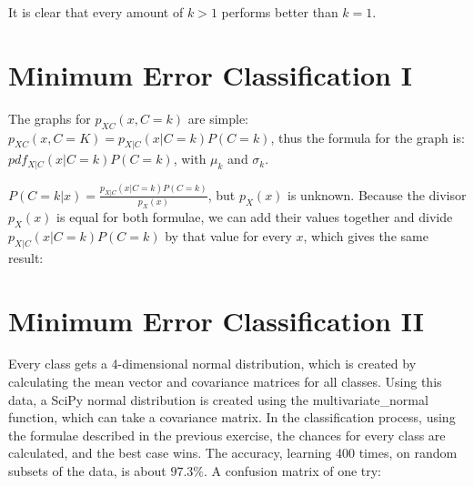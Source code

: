 \documentclass{article}
\begin{document}
\inputminted{text}{knnb.txt}

It is clear that every amount of $k > 1$ performs better than $k=1$.

\section{Minimum Error Classification I}
The graphs for $p_{XC}(x, C=k)$ are simple: $p_{XC}(x, C=K) =
p_{X|C}(x|C=k)P(C=k)$, thus the formula for the graph is: $pdf_{X|C}(x|C=k)
P(C=k)$, with $\mu_k$ and $\sigma_k$.

$P(C=k|x) = \frac{p_{X|C}(x|C=k)P(C=k)}{p_X(x)}$, but $p_X(x)$ is unknown.
Because the divisor $p_X(x)$ is equal for both formulae, we can add their values
together and divide $p_{X|C}(x|C=k)P(C=k)$ by that value for every $x$, which
gives the same result:



\section{Minimum Error Classification II}
Every class gets a 4-dimensional normal distribution, which is created by
calculating the mean vector and covariance matrices for all classes. Using this
data, a SciPy normal distribution is created using the multivariate\_normal
function, which can take a covariance matrix. In the classification process,
using the formulae described in the previous exercise, the chances for every
class are calculated, and the best case wins. The accuracy, learning 400 times,
on random subsets of the data, is about $97.3\%$. A confusion matrix of one try:

\inputminted{text}{minerr_2.txt}
\end{document}
